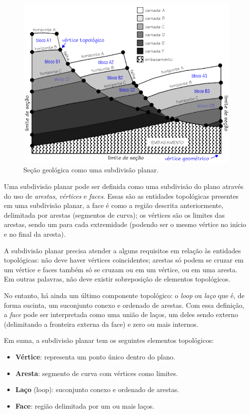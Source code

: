 \begin{figure} [h]
  \begin{center}
    \includegraphics[width=400pt]{images/fig-subdivisao-planar}
    \caption{Seção geológica como uma subdivisão planar.\cite{Ferraz}}\label{fig-subdivisao-planar}
  \end{center}
\end{figure}

Uma subdivisão planar pode ser definida como uma subdivisão do plano através do uso de \textit{arestas}, \textit{vértices} e \textit{faces}. Essas são as entidades topológicas presentes em uma subdivisão planar, a face é como a região descrita anteriormente, delimitada por arestas (segmentos de curva); os vértices são os limites das arestas, sendo um para cada extremidade (podendo ser o mesmo vértice no início e no final da aresta).

A subdivisão planar precisa atender a alguns requisitos em relação às entidades topológicas: não deve haver vértices coincidentes; arestas só podem se cruzar em um vértice e faces também só se cruzam ou em um vértice, ou em uma aresta. Em outras palavras, não deve existir sobreposição de elementos topológicos. 

No entanto, há ainda um último componente topológico: o \textit{loop} ou \textit{laço} que é, de forma sucinta, um suconjunto conexo e ordenado de arestas. Com essa definição, a \textit{face} pode ser interpretada como uma união de laços, um deles sendo externo (delimitando a fronteira externa da face) e zero ou mais internos.

Em suma, a subdivisão planar tem os seguintes elementos topológicos:
\renewcommand{\labelitemi}{•}
\begin{itemize}
  \item \textbf{Vértice}: representa um ponto único dentro do plano.
  \item \textbf{Aresta}: segmento de curva com vértices como limites.
  \item \textbf{Laço} (loop): suconjunto conexo e ordenado de arestas.
  \item \textbf{Face}: região delimitada por um ou mais laços.
\end{itemize}

